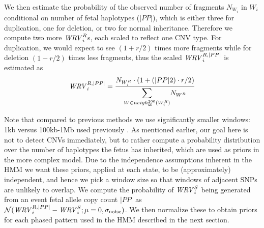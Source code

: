 We then estimate the probability of the observed number of fragments $N_{W_i}$ in $W_i$ conditional on number of fetal haplotypes ($|PP|$), which is either three for duplication, one for deletion, or two for normal inheritance. Therefore we compute two more $\mathit{WRV}_i^R$s, each scaled to reflect one CNV type. For duplication, we would expect to see $(1+r/2)$ times more fragments while for deletion $(1-r/2)$ times less fragments, thus the scaled $\mathit{WRV}_i^{R,|PP|}$ is estimated as
\begin{align}
\WRV_i^{R,|PP|} = \frac{ N_{W_i^R} \cdot (1+(|PP|\-2)\cdot r/2) }{ \mathlarger{\sum_{W \in neigh_{\G\C}^{200}(W_i^R)}} N_{W^R} }
\end{align}

Note that compared to previous methods we use significantly smaller windows: 1kb versus 100kb-1Mb used previously \cite{chen2013, srinivasan2013}. As mentioned earlier, our goal here is not to detect CNVs immediately, but to rather compute a probability distribution over the number of haplotypes the fetus has inherited, which are used as  priors in the more complex model. Due to the independence assumptions inherent in the HMM we want these priors, applied at each state, to be (approximately) independent, and hence we pick a window size so that windows of adjacent SNPs are unlikely to overlap. We compute the probability of $\mathit{WRV}_i^S$  being generated from an event fetal allele copy count $|PP|$ as $\mathcal{N}(\mathit{WRV}_i^{R,|PP|}-\mathit{WRV}_i^S; \mu=0, \sigma_{\text{noise}})$. We then normalize these to obtain priors for each phased pattern used in the HMM described in the next section. 

